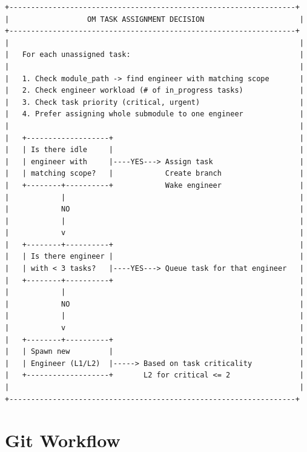 \documentclass[11pt,a4paper]{article}
\begin{document}
\begin{verbatim}
+------------------------------------------------------------------+
|                  OM TASK ASSIGNMENT DECISION                      |
+------------------------------------------------------------------+
|                                                                   |
|   For each unassigned task:                                       |
|                                                                   |
|   1. Check module_path -> find engineer with matching scope       |
|   2. Check engineer workload (# of in_progress tasks)             |
|   3. Check task priority (critical, urgent)                       |
|   4. Prefer assigning whole submodule to one engineer             |
|                                                                   |
|   +-------------------+                                           |
|   | Is there idle     |                                           |
|   | engineer with     |----YES---> Assign task                    |
|   | matching scope?   |            Create branch                  |
|   +--------+----------+            Wake engineer                  |
|            |                                                      |
|            NO                                                     |
|            |                                                      |
|            v                                                      |
|   +--------+----------+                                           |
|   | Is there engineer |                                           |
|   | with < 3 tasks?   |----YES---> Queue task for that engineer   |
|   +--------+----------+                                           |
|            |                                                      |
|            NO                                                     |
|            |                                                      |
|            v                                                      |
|   +--------+----------+                                           |
|   | Spawn new         |                                           |
|   | Engineer (L1/L2)  |-----> Based on task criticality           |
|   +-------------------+       L2 for critical <= 2                |
|                                                                   |
+------------------------------------------------------------------+
\end{verbatim}

\section{Git Workflow}
\end{document}
